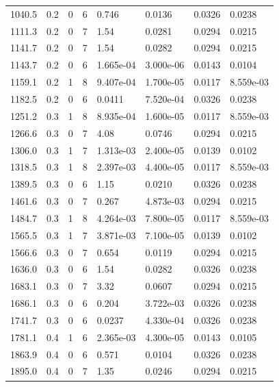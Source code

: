 \documentclass[preview]{standalone}
\begin{document}
{{{\begin{tabular}{L{1.2cm}C{1.2cm} C{0.3cm}C{0.5cm} C{1.4cm}C{1.4cm} C{1.4cm}C{1.4cm}}
  1040.5  &   0.2  & 0     &  6 &  0.746  & 0.0136  & 0.0326 &  0.0238   \\ 
  1111.3  &   0.2  & 0     &  7 &  1.54  & 0.0281  & 0.0294 &  0.0215   \\ 
  1141.7  &   0.2  & 0     &  7 &  1.54  & 0.0282  & 0.0294 &  0.0215   \\ 
  1143.7  &   0.2  & 0     &  6 &  1.665e-04  & 3.000e-06  & 0.0143 &  0.0104   \\ 
  1159.1  &   0.2  & 1     &  8 &  9.407e-04  & 1.700e-05  & 0.0117 &  8.559e-03   \\ 
  1182.5  &   0.2  & 0     &  6 &  0.0411  & 7.520e-04  & 0.0326 &  0.0238   \\ 
  1251.2  &   0.3  & 1     &  8 &  8.935e-04  & 1.600e-05  & 0.0117 &  8.559e-03   \\ 
  1266.6  &   0.3  & 0     &  7 &  4.08  & 0.0746  & 0.0294 &  0.0215   \\ 
  1306.0  &   0.3  & 1     &  7 &  1.313e-03  & 2.400e-05  & 0.0139 &  0.0102   \\ 
  1318.5  &   0.3  & 1     &  8 &  2.397e-03  & 4.400e-05  & 0.0117 &  8.559e-03   \\ 
  1389.5  &   0.3  & 0     &  6 &  1.15  & 0.0210  & 0.0326 &  0.0238   \\ 
  1461.6  &   0.3  & 0     &  7 &  0.267  & 4.873e-03  & 0.0294 &  0.0215   \\ 
  1484.7  &   0.3  & 1     &  8 &  4.264e-03  & 7.800e-05  & 0.0117 &  8.559e-03   \\ 
  1565.5  &   0.3  & 1     &  7 &  3.871e-03  & 7.100e-05  & 0.0139 &  0.0102   \\ 
  1566.6  &   0.3  & 0     &  7 &  0.654  & 0.0119  & 0.0294 &  0.0215   \\ 
  1636.0  &   0.3  & 0     &  6 &  1.54  & 0.0282  & 0.0326 &  0.0238   \\ 
  1683.1  &   0.3  & 0     &  7 &  3.32  & 0.0607  & 0.0294 &  0.0215   \\ 
  1686.1  &   0.3  & 0     &  6 &  0.204  & 3.722e-03  & 0.0326 &  0.0238   \\ 
  1741.7  &   0.3  & 0     &  6 &  0.0237  & 4.330e-04  & 0.0326 &  0.0238   \\ 
  1781.1  &   0.4  & 1     &  6 &  2.365e-03  & 4.300e-05  & 0.0143 &  0.0105   \\ 
  1863.9  &   0.4  & 0     &  6 &  0.571  & 0.0104  & 0.0326 &  0.0238   \\ 
  1895.0  &   0.4  & 0     &  7 &  1.35  & 0.0246  & 0.0294 &  0.0215   \\ 

\end{tabular}}}}
\end{document}
